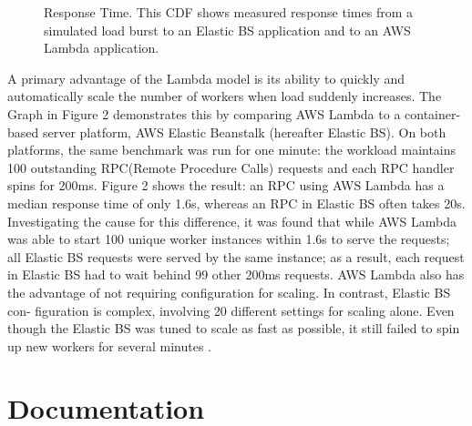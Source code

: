 \documentclass[9pt,twocolumn,twoside]{styles/osajnl}
\begin{document}
\begin{figure}[H]
\centering
\graphicspath{ {images/} }
\caption{Response Time. This CDF shows measured
response times from a simulated load burst to an Elastic BS
application and to an AWS Lambda application.}  \cite{OpenLambda}
\label{fig:false-color}
\end{figure}

A primary advantage of the Lambda model is its ability
to quickly and automatically scale the number of workers
when load suddenly increases. The Graph in Figure 2 demonstrates this by 
comparing AWS Lambda to a container-based server platform,
AWS Elastic Beanstalk \cite{www-AWSEBS} (hereafter Elastic BS).
On both platforms, the same benchmark was run for one
minute: the workload maintains 100 outstanding RPC(Remote Procedure Calls)
requests and each RPC handler spins for 200ms.
Figure 2 shows the result: an RPC using AWS Lambda
has a median response time of only 1.6s, whereas an RPC
in Elastic BS often takes 20s. Investigating the cause for
this difference, it was found that while AWS Lambda was
able to start 100 unique worker instances within 1.6s to
serve the requests; all Elastic BS requests were served by
the same instance; as a result, each request in Elastic BS
had to wait behind 99 other 200ms requests.
AWS Lambda also has the advantage of not requiring
configuration for scaling. In contrast, Elastic BS con-
figuration is complex, involving 20 different settings for
scaling alone. Even though the Elastic BS was tuned to scale
as fast as possible, it still
failed to spin up new workers for several minutes  \cite{OpenLambda}.

\section{Documentation}
\end{document}
